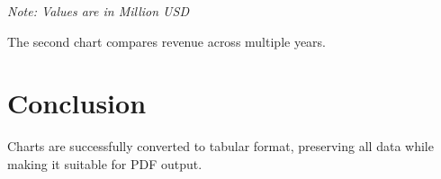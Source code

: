 \documentclass[12pt,a4paper]{article}
\begin{document}
\begin{table}[htbp]
\centering
\small
{}
\caption{Revenue comparison between 2023 and 2024}
\label{tab:chart}

\textit{\small Note: Values are in Million USD}
\end{table}

The second chart compares revenue across multiple years.

\section*{Conclusion}

Charts are successfully converted to tabular format, preserving all data while making it suitable for PDF output.
\end{document}
